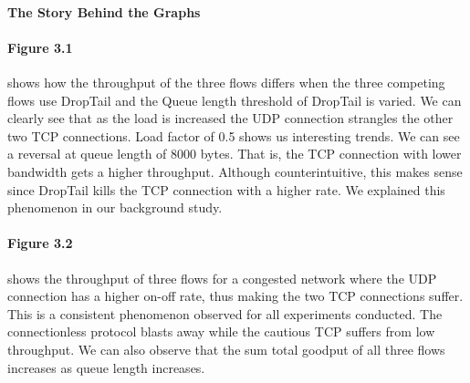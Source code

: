 \documentclass[paper=a4, fontsize=12pt]{scrartcl} %
\numberwithin{equation}{section} %
\numberwithin{figure}{section} %
\numberwithin{table}{section} %
\begin{document}
\paragraph{\newline The Story Behind the Graphs} 
\hspace{-10pt}\paragraph{Figure 3.1}
\hspace{-10pt} shows how the throughput of the three flows differs when the three competing flows use DropTail and the Queue length threshold of DropTail is varied. We can clearly see that as the load is increased the UDP connection strangles the other two TCP connections. Load factor of 0.5 shows us interesting trends. We can see a reversal at queue length of 8000 bytes. That is, the TCP connection with lower bandwidth gets a higher throughput. Although counterintuitive, this makes sense since DropTail kills the TCP connection with a higher rate. We explained this phenomenon in our background study.
\paragraph{Figure 3.2}
\hspace{-10pt} shows the throughput of three flows for a congested network where the UDP connection has a higher on-off rate, thus making the two TCP connections suffer. This is a consistent phenomenon observed for all experiments conducted. The connectionless protocol blasts away while the cautious TCP suffers from low throughput. We can also observe that the sum total goodput of all three flows increases as queue length increases.
\newpage
\end{document}
